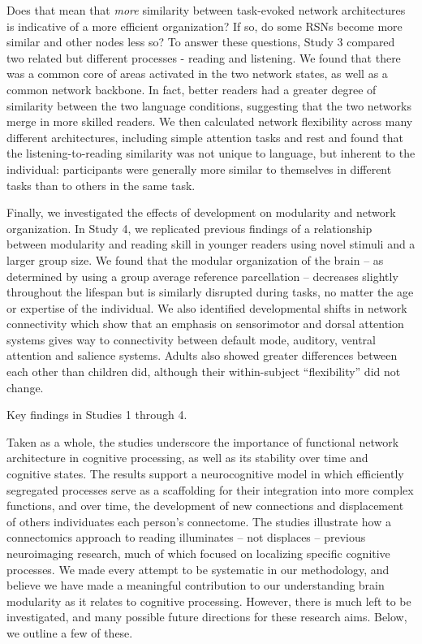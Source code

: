 Does that mean that \textit{more} similarity between task-evoked network architectures is indicative of a more efficient organization? If so, do some RSNs become more similar and other nodes less so?  To answer these questions, Study 3 compared two related but different processes - reading and listening. We found that there was a common core of areas activated in the two network states, as well as a common network backbone. In fact, better readers had a greater degree of similarity between the two language conditions, suggesting that the two networks merge in more skilled readers. We then calculated network flexibility across many different architectures, including simple attention tasks and rest and found that the listening-to-reading similarity was not unique to language, but inherent to the individual: participants were generally more similar to themselves in different tasks than to others in the same task.

Finally, we investigated the effects of development on modularity and network organization. In Study 4, we replicated previous findings of a relationship between modularity and reading skill in younger readers using novel stimuli and a larger group size. We found that the modular organization of the brain -- as determined by using a group average reference parcellation -- decreases slightly throughout the lifespan but is similarly disrupted during tasks, no matter the age or expertise of the individual. We also identified developmental shifts in network connectivity which show that an emphasis on sensorimotor and dorsal attention systems gives way to connectivity between default mode, auditory, ventral attention and salience systems. Adults also showed greater differences between each other than children did, although their within-subject ``flexibility'' did not change.

\begin{table}[t]
	\renewcommand{\tabcolsep}{0.2cm}
	\centering
	
	\caption[Key findings in Studies 1 through 4.]{Key findings in Studies 1 through 4.}
	\label{table:ch6-key-findings}
\end{table}

Taken as a whole, the studies underscore the importance of functional network architecture in cognitive processing, as well as its stability over time and cognitive states. The results support a neurocognitive model in which efficiently segregated processes serve as a scaffolding for their integration into more complex functions, and over time, the development of new connections and displacement of others individuates each person's connectome. The studies illustrate how a connectomics approach to reading illuminates -- not displaces -- previous neuroimaging research, much of which focused on localizing specific cognitive processes. We made every attempt to be systematic in our methodology, and believe we have made a meaningful contribution to our understanding brain modularity as it relates to cognitive processing. However, there is much left to be investigated, and many possible future directions for these research aims. Below, we outline a few of these.

